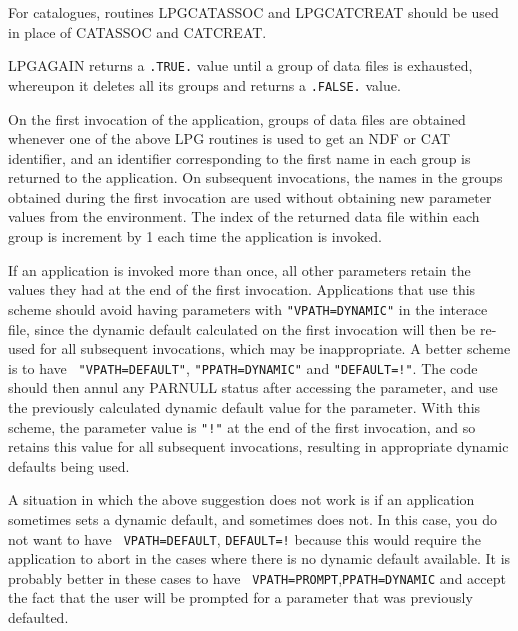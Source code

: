 \documentclass[twoside,11pt]{article}
\newcommand{\htmlref}[2]{#1}
\newcommand{\xref}[3]{#1}
\renewcommand{\_}{\texttt{\symbol{95}}}
\begin{document}
{{      For catalogues, routines \htmlref{LPG\_CATASSOC}{LPG_CATASSOC} and
      \htmlref{LPG\_CATCREAT}{LPG_CATCREAT} should be used in place of
      \xref{CAT\_ASSOC}{sun181}{CAT_ASSOC} and
      \xref{CAT\_CREAT}{sun181}{CAT_CREAT}.

      LPG\_AGAIN returns a {\tt .TRUE.} value until a group of data files is
      exhausted, whereupon it deletes all its groups and returns a
      {\tt .FALSE.} value.

      On the first invocation of the application, groups of data files are
      obtained whenever one of the above LPG routines is used to get an NDF
      or CAT identifier, and an identifier corresponding to the first name in
      each group is returned to the application. On subsequent invocations,
      the names in the groups obtained during the first invocation are used
      without obtaining new parameter values from the environment. The
      index of the returned data file within each group is increment by 1
      each time the application is invoked.

      If an application is invoked more than once, all other
      parameters retain the values they had at the end of the first
      invocation. Applications that use this scheme should avoid
      having parameters with {\tt "VPATH=DYNAMIC"} in the interace
      file, since the dynamic default calculated on the first
      invocation will then be re-used for all subsequent invocations,
      which may be inappropriate. A better scheme is to have {\tt
      "VPATH=DEFAULT"}, {\tt "PPATH=DYNAMIC"} and {\tt "DEFAULT=!"}.
      The code should then annul any PAR\_\_NULL status after
      accessing the parameter, and use the previously calculated
      dynamic default value for the parameter. With this scheme, the
      parameter value is {\tt "!"} at the end of the first invocation,
      and so retains this value for all subsequent invocations,
      resulting in appropriate dynamic defaults being used.

      A situation in which the above suggestion does not work is if an
      application sometimes sets a dynamic default, and sometimes
      does not. In this case, you do not want to have {\tt
      VPATH=DEFAULT}, {\tt DEFAULT=!} because this would require the
      application to abort in the cases where there is no dynamic default
      available. It is probably better in these cases to have {\tt
      VPATH=PROMPT},{\tt PPATH=DYNAMIC} and accept the fact that the user
      will be prompted for a parameter that was previously defaulted.

}}
\end{document}
